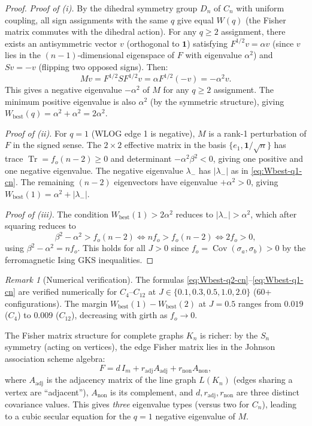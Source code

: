 \documentclass[11pt]{article}
\theoremstyle{definition}
\theoremstyle{remark}
\newtheorem{remark}[theorem]{Remark}
\newcommand{\Fish}{F}
\newcommand{\Met}{M}
\newcommand{\Cov}{\operatorname{Cov}}
\newcommand{\edgeo}{\sigma}
\begin{document}
\begin{proof}
\textit{Proof of (i).} By the dihedral symmetry group $D_n$ of $C_n$ with
uniform coupling, all sign assignments with the same $q$ give equal $W(q)$
(the Fisher matrix commutes with the dihedral action). For any $q \geq 2$
assignment, there exists an antisymmetric vector $v$ (orthogonal to
$\mathbf{1}$) satisfying $\Fish^{1/2} v = \alpha v$ (since $v$ lies in the
$(n-1)$-dimensional eigenspace of $\Fish$ with eigenvalue $\alpha^2$) and
$Sv = -v$ (flipping two opposed signs). Then:
\[
  \Met v = \Fish^{1/2} S \Fish^{1/2} v = \alpha \Fish^{1/2}(-v) = -\alpha^2 v.
\]
This gives a negative eigenvalue $-\alpha^2$ of $\Met$ for any $q \geq 2$
assignment. The minimum positive eigenvalue is also $\alpha^2$ (by the
symmetric structure), giving $W_{\mathrm{best}}(q) = \alpha^2 + \alpha^2 = 2\alpha^2$.

\textit{Proof of (ii).} For $q = 1$ (WLOG edge 1 is negative), $\Met$ is
a rank-1 perturbation of $\Fish$ in the signed sense. The $2 \times 2$
effective matrix in the basis $\{e_1, \mathbf{1}/\sqrt{n}\}$ has trace
$\operatorname{Tr} = f_o(n-2) \geq 0$ and determinant $-\alpha^2 \beta^2 < 0$,
giving one positive and one negative eigenvalue. The negative eigenvalue
$\lambda_-$ has $|\lambda_-|$ as in \eqref{eq:Wbest-q1-cn}.
The remaining $(n-2)$ eigenvectors have eigenvalue $+\alpha^2 > 0$,
giving $W_{\mathrm{best}}(1) = \alpha^2 + |\lambda_-|$.

\textit{Proof of (iii).} The condition $W_{\mathrm{best}}(1) > 2\alpha^2$
reduces to $|\lambda_-| > \alpha^2$, which after squaring reduces to
\[
  \beta^2 - \alpha^2 > f_o(n-2) \iff nf_o > f_o(n-2) \iff 2f_o > 0,
\]
using $\beta^2 - \alpha^2 = nf_o$. This holds for all $J > 0$ since
$f_o = \Cov(\edgeo_a, \edgeo_b) > 0$ by the ferromagnetic Ising GKS inequalities.
\end{proof}

\begin{remark}[Numerical verification]
The formulas \eqref{eq:Wbest-q2-cn}--\eqref{eq:Wbest-q1-cn} are verified numerically
for $C_4$--$C_{12}$ at $J \in \{0.1, 0.3, 0.5, 1.0, 2.0\}$ (60+ configurations).
The margin $W_{\mathrm{best}}(1) - W_{\mathrm{best}}(2)$ at $J = 0.5$ ranges
from $0.019$ ($C_4$) to $0.009$ ($C_{12}$), decreasing with girth as $f_o \to 0$.
\end{remark}

The Fisher matrix structure for complete graphs $K_n$ is richer: by the
$S_n$ symmetry (acting on vertices), the edge Fisher matrix lies in the
Johnson association scheme algebra:
\begin{equation}
  \Fish = d \, I_m + r_{\mathrm{adj}} A_{\mathrm{adj}} + r_{\mathrm{non}} A_{\mathrm{non}},
  \label{eq:fisher-kn-structure}
\end{equation}
where $A_{\mathrm{adj}}$ is the adjacency matrix of the line graph $L(K_n)$
(edges sharing a vertex are ``adjacent''), $A_{\mathrm{non}}$ is its complement,
and $d, r_{\mathrm{adj}}, r_{\mathrm{non}}$ are three distinct covariance values.
This gives \emph{three} eigenvalue types (versus two for $C_n$), leading
to a cubic secular equation for the $q = 1$ negative eigenvalue of $\Met$.
\end{document}
